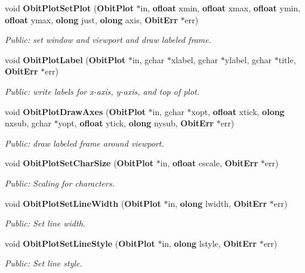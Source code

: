 \begin{CompactItemize}
void {\bf Obit\-Plot\-Set\-Plot} ({\bf Obit\-Plot} $\ast$in, {\bf ofloat} xmin, {\bf ofloat} xmax, {\bf ofloat} ymin, {\bf ofloat} ymax, {\bf olong} just, {\bf olong} axis, {\bf Obit\-Err} $\ast$err)
\begin{CompactList}\small\item\em Public: set window and viewport and draw labeled frame. \item\end{CompactList}\item 
void {\bf Obit\-Plot\-Label} ({\bf Obit\-Plot} $\ast$in, gchar $\ast$xlabel, gchar $\ast$ylabel, gchar $\ast$title, {\bf Obit\-Err} $\ast$err)
\begin{CompactList}\small\item\em Public: write labels for x-axis, y-axis, and top of plot. \item\end{CompactList}\item 
void {\bf Obit\-Plot\-Draw\-Axes} ({\bf Obit\-Plot} $\ast$in, gchar $\ast$xopt, {\bf ofloat} xtick, {\bf olong} nxsub, gchar $\ast$yopt, {\bf ofloat} ytick, {\bf olong} nysub, {\bf Obit\-Err} $\ast$err)
\begin{CompactList}\small\item\em Public: draw labeled frame around viewport. \item\end{CompactList}\item 
void {\bf Obit\-Plot\-Set\-Char\-Size} ({\bf Obit\-Plot} $\ast$in, {\bf ofloat} cscale, {\bf Obit\-Err} $\ast$err)
\begin{CompactList}\small\item\em Public: Scaling for characters. \item\end{CompactList}\item 
void {\bf Obit\-Plot\-Set\-Line\-Width} ({\bf Obit\-Plot} $\ast$in, {\bf olong} lwidth, {\bf Obit\-Err} $\ast$err)
\begin{CompactList}\small\item\em Public: Set line width. \item\end{CompactList}\item 
void {\bf Obit\-Plot\-Set\-Line\-Style} ({\bf Obit\-Plot} $\ast$in, {\bf olong} lstyle, {\bf Obit\-Err} $\ast$err)
\begin{CompactList}\small\item\em Public: Set line style. \item\end{CompactList}\item 

\end{CompactItemize}
